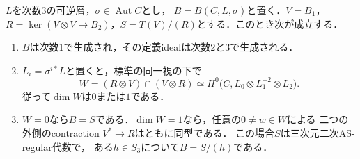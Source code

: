 \documentclass[11pt,a4paper]{ltjsarticle}
\begin{document}
\begin{lemma}[三次までの関係式と唯一のoverlap]\label{lem:cubic-relations-overlap}
$L$を次数3の可逆層，$\sigma\in\operatorname{Aut}C$とし，
$B=B(C,L,\sigma)$と置く．$V=B_1$，
$R=\ker(V\otimes V\to B_2)$，$S=T(V)/(R)$とする．このとき次が成立する．
\begin{enumerate}
\item $B$は次数1で生成され，その定義idealは次数2と3で生成される．
\item $L_i=\sigma^{i*}L$と置くと，標準の同一視の下で
\[
 W=(R\otimes V)\cap(V\otimes R)
 \simeq H^0\bigl(C,L_0\otimes L_1^{-2}\otimes L_2\bigr).
\]
従って$\dim W$は$0$または$1$である．
\item $W=0$なら$B=S$である．$\dim W=1$なら，任意の$0\ne w\in W$による
二つの外側のcontraction $V^*\to R$はともに同型である．
この場合$S$は三次元二次AS-regular代数で，
ある$h\in S_3$について$B=S/(h)$である．
\end{enumerate}
\end{lemma}
\end{document}
